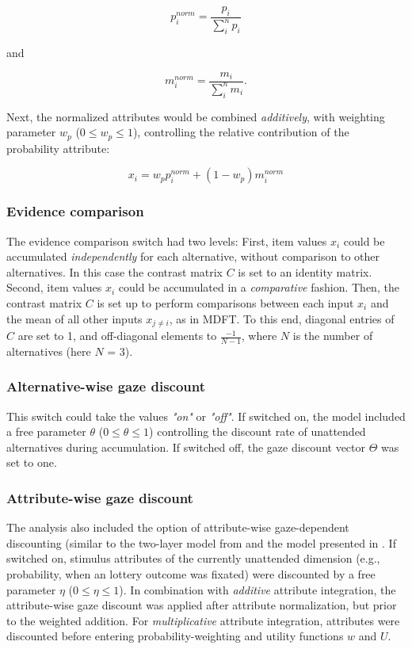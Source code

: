 \documentclass[11pt, a4paper]{article}
\begin{document}
$$p^{norm}_i = \frac{p_i}{\sum_i^n{p_i}}$$

and

$$m^{norm}_i = \frac{m_i}{\sum_i^n{m_i}}.$$

Next, the normalized attributes would be combined \emph{additively}, with weighting parameter $w_p$ ($0 \le w_p \le 1$), controlling the relative contribution of the probability attribute:

$$x_i = w_p p^{norm}_i + (1 - w_p) m^{norm}_i$$

\subsubsection*{Evidence comparison}
The evidence comparison switch had two levels: First, item values $x_i$ could be accumulated \emph{independently} for each alternative, without comparison to other alternatives. In this case the contrast matrix $C$ is set to an identity matrix. Second, item values $x_i$ could be accumulated in a \emph{comparative} fashion. Then, the contrast matrix $C$ is set up to perform comparisons between each input $x_i$ and the mean of all other inputs $x_{j \ne i}$, as in MDFT. To this end, diagonal entries of $C$ are set to 1, and off-diagonal elements to $\frac{-1}{N-1}$, where $N$ is the number of alternatives (here $N$ = 3).

\subsubsection*{Alternative-wise gaze discount}
This switch could take the values \emph{"on"} or \emph{"off"}. If switched on, the model included a free parameter $\theta$ ($0 \le \theta \le 1$) controlling the discount rate of unattended alternatives during accumulation. If switched off, the gaze discount vector $\Theta$ was set to one.

\subsubsection*{Attribute-wise gaze discount}
The analysis also included the option of attribute-wise gaze-dependent discounting (similar to the two-layer model from \parencite{glickman2019FormationPreferenceRisky} and the model presented in \parencite{fisher2017AttentionalDriftDiffusion}. If switched on, stimulus attributes of the currently unattended dimension (e.g., probability, when an lottery outcome was fixated) were discounted by a free parameter $\eta$ ($0 \le \eta \le 1$). In combination with \emph{additive} attribute integration, the attribute-wise gaze discount was applied after attribute normalization, but prior to the weighted addition. For \emph{multiplicative} attribute integration, attributes were discounted before entering probability-weighting and utility functions $w$ and $U$.
\end{document}
